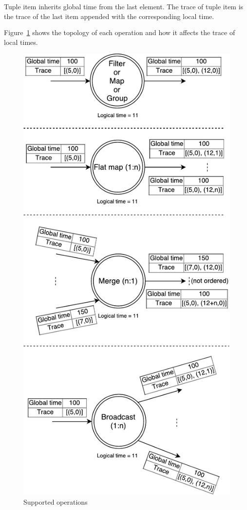 Tuple item inherits global time from the last element. The trace of tuple item is the trace of the last item appended with the corresponding local time.  

Figure~\ref{logical-graph-ops-figure} shows the topology of each operation and how it affects the trace of local times.

\begin{figure}[htbp]
  \centering
  \includegraphics[scale=0.5]{pics/operations}
  \caption{Supported operations}
  \label {logical-graph-ops-figure}
\end{figure}

